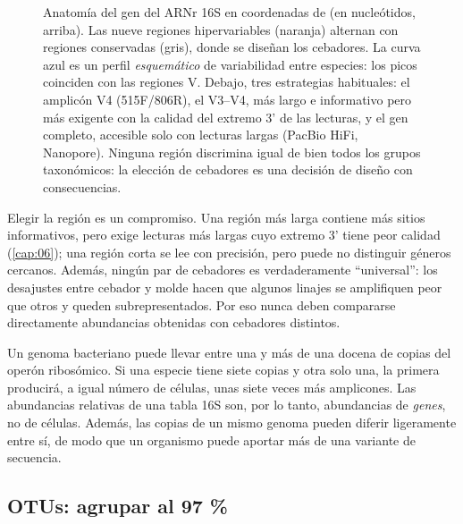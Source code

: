 \begin{figure}[t]
\caption[Estructura del gen 16S rRNA]{Anatomía del gen del ARNr 16S en coordenadas de  (en nucleótidos, arriba). Las nueve regiones hipervariables (naranja) alternan con regiones conservadas (gris), donde se diseñan los cebadores. La curva azul es un perfil \emph{esquemático} de variabilidad entre especies: los picos coinciden con las regiones V. Debajo, tres estrategias habituales: el amplicón V4 (515F/806R), el V3–V4, más largo e informativo pero más exigente con la calidad del extremo 3' de las lecturas, y el gen completo, accesible solo con lecturas largas (PacBio HiFi, Nanopore). Ninguna región discrimina igual de bien todos los grupos taxonómicos: la elección de cebadores es una decisión de diseño con consecuencias.}
\label{fig:14-16s}
\end{figure}

Elegir la región es un compromiso. Una región más larga contiene más sitios informativos, pero exige lecturas más largas cuyo extremo 3' tiene peor calidad (\cref{cap:06}); una región corta se lee con precisión, pero puede no distinguir géneros cercanos. Además, ningún par de cebadores es verdaderamente ``universal'': los desajustes entre cebador y molde hacen que algunos linajes se amplifiquen peor que otros y queden subrepresentados. Por eso nunca deben compararse directamente abundancias obtenidas con cebadores distintos.

\begin{cuidado}
Un genoma bacteriano puede llevar entre una y más de una docena de copias del operón ribosómico. Si una especie tiene siete copias y otra solo una, la primera producirá, a igual número de células, unas siete veces más amplicones. Las abundancias relativas de una tabla 16S son, por lo tanto, abundancias de \emph{genes}, no de células. Además, las copias de un mismo genoma pueden diferir ligeramente entre sí, de modo que un organismo puede aportar más de una variante de secuencia.
\end{cuidado}

\subsection{OTUs: agrupar al 97 \%}

